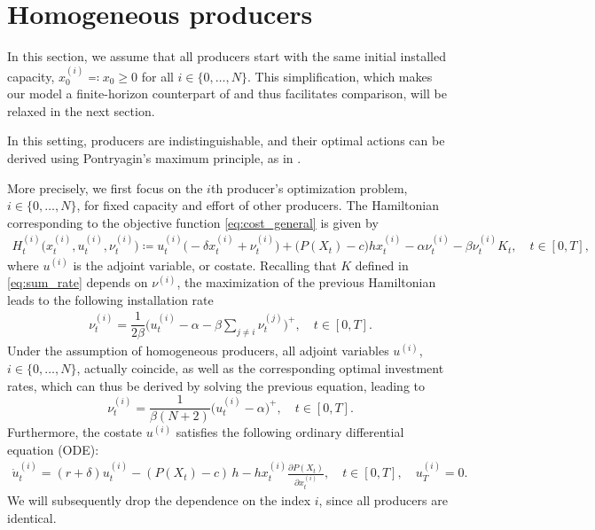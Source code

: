 \documentclass[12pt]{article}
\def\Nu{K}
\begin{document}
\section{Homogeneous producers}
\label{section_hom}

In this section, we assume that all producers start with the same initial installed capacity, $x_0^{(i)} \eqcolon x_0 \geq 0$ for all $i \in \{0, \dots, N\}$. This simplification, which makes our model a finite-horizon counterpart of \cite{alasseur2023mean} and thus facilitates comparison, will be relaxed in the next section.

In this setting, producers are indistinguishable, and their optimal actions can be derived using Pontryagin's maximum principle, as in \cite{alasseur2023mean}.

More precisely, we first focus on the $i$th producer's optimization problem, $i \in \{0,\dots,N\}$, for fixed capacity and effort of other producers. The Hamiltonian corresponding to the objective function \eqref{eq:cost_general} is given by
\begin{align*}
    H^{(i)}_t \big(x_{t}^{(i)}, u_{t}^{(i)}, \nu_{t}^{(i)} \big) \coloneq u_{t}^{(i)} \big( - \delta x_{t}^{(i)} + \nu_{t}^{(i)} \big) + \big( P(X_t) - c \big) h x_{t}^{(i)} - \alpha \nu_t^{(i)} - \beta 
\nu^{(i)}_t \Nu_t, \quad t \in [0,T],
\end{align*}
where ${u}^{(i)}$ is the adjoint variable, or costate. Recalling that $K$ defined in \eqref{eq:sum_rate} depends on $\nu^{(i)}$, the maximization of the previous Hamiltonian leads to the following installation rate
\begin{align*}
\nu_t^{(i)}= \dfrac{1}{2\beta} \bigg(u_{t}^{(i)}-\alpha-\beta\sum_{j\neq i}\nu_{t}^{(j)}\bigg)^+, \quad t \in [0,T].
\end{align*}
Under the assumption of homogeneous producers, all adjoint variables ${u}^{(i)}$, $i \in \{0, \dots, N\}$, actually coincide, as well as the corresponding optimal investment rates, which can thus be derived by solving the previous equation, leading to
\begin{equation*}
\nu_{t}^{(i)}= \dfrac{1}{\beta(N+2)} \big(u_t^{(i)}-\alpha \big)^+, \quad t\in [0,T].
\end{equation*}
Furthermore, the costate ${u}^{(i)}$ satisfies the following ordinary differential equation (ODE):
\begin{align*}
    \dot{u}_{t}^{(i)} = (r + \delta) u_{t}^{(i)} - (P(X_t)-c)\,h-h  x_{t}^{(i)}\frac{\partial P(X_t)}{\partial x_{t}^{(i)}}, \quad t \in [0,T], \quad u_{T}^{(i)}=0.
\end{align*}
We will subsequently drop the dependence on the index $i$, since all producers are identical.
\end{document}
